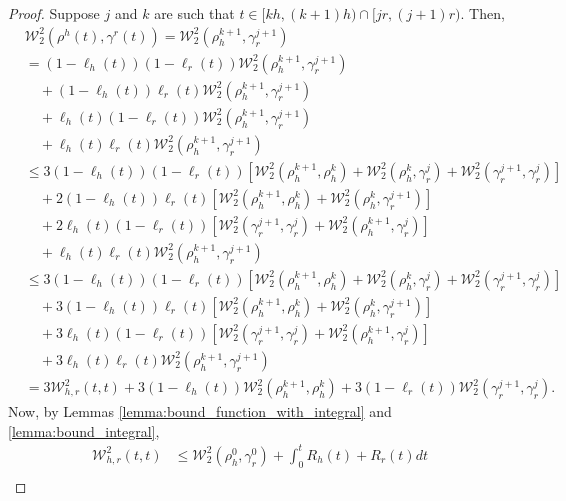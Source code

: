 \documentclass[final,12pt]{colt2018}
\newcommand{\was}{\mathcal{W}}
\begin{document}
\begin{proof}
Suppose $j$ and $k$ are such that $t \in [kh, (k+1)h) \cap  [jr, (j+1)r)$. Then,
\begin{align*}
&\was^2_2 (\rho^{h}(t), \gamma^{r}(t))  = \was_2^2(\rho_{h}^{k+1},\gamma_{r}^{j+1}) \\
&=  (1- \ell_{h}(t))(1- \ell_{r}(t))\was_2^2(\rho_{h}^{k+1},\gamma_{r}^{j+1})  \\
&\quad +(1- \ell_{h}(t))\ell_{r}(t)\was_2^2(\rho_{h}^{k+1},\gamma_{r}^{j+1})   \\
&\quad + \ell_{h}(t) (1- \ell_{r}(t))\was_2^2(\rho_{h}^{k+1},\gamma_{r}^{j+1})  \\
&\quad + \ell_{h}(t)\ell_{r}(t) \was_2^2(\rho_{h}^{k+1},\gamma_{r}^{j+1}) \\
&\leq  3(1- \ell_{h}(t))(1- \ell_{r}(t))\left[ \was_2^2(\rho_{h}^{k+1},\rho_{h}^{k}) + \was_2^2(\rho_{h}^{k},\gamma_{r}^{j}) + \was_2^2(\gamma_{r}^{j+1},\gamma_{r}^{j})\right]  \\
&\quad +2(1- \ell_{h}(t))\ell_{r}(t)\left[ \was_2^2(\rho_{h}^{k+1},\rho_{h}^{k}) + \was_2^2(\rho_{h}^{k},\gamma_{r}^{j+1})\right]  \\
&\quad + 2\ell_{h}(t) (1- \ell_{r}(t))\left[ \was_2^2(\gamma_{r}^{j+1},\gamma_{r}^{j}) + \was_2^2(\rho_{h}^{k+1},\gamma_{r}^{j}) \right]  \\
&\quad + \ell_{h}(t)\ell_{r}(t) \was_2^2(\rho_{h}^{k+1},\gamma_{r}^{j+1}) \\
&\leq  3(1- \ell_{h}(t))(1- \ell_{r}(t))\left[ \was_2^2(\rho_{h}^{k+1},\rho_{h}^{k}) + \was_2^2(\rho_{h}^{k},\gamma_{r}^{j}) + \was_2^2(\gamma_{r}^{j+1},\gamma_{r}^{j})\right]  \\
&\quad +3(1- \ell_{h}(t))\ell_{r}(t)\left[ \was_2^2(\rho_{h}^{k+1},\rho_{h}^{k}) + \was_2^2(\rho_{h}^{k},\gamma_{r}^{j+1})\right]  \\
&\quad + 3\ell_{h}(t) (1- \ell_{r}(t))\left[ \was_2^2(\gamma_{r}^{j+1},\gamma_{r}^{j}) + \was_2^2(\rho_{h}^{k+1},\gamma_{r}^{j}) \right]  \\
&\quad + 3\ell_{h}(t)\ell_{r}(t) \was_2^2(\rho_{h}^{k+1},\gamma_{r}^{j+1}) \\
& =  3\was^2_{h, r}(t,t) + 3(1- \ell_{h}(t))\was_2^2(\rho_{h}^{k+1},\rho_{h}^{k}) + 3(1- \ell_{r}(t)) \was_2^2(\gamma_{r}^{j+1},\gamma_{r}^{j}).
\end{align*}
Now, by Lemmas \ref{lemma:bound_function_with_integral} and \ref{lemma:bound_integral}, 
\begin{align}
\was^2_{h, r}(t,t) &\leq \was_2^2(\rho_{h}^0, \gamma_{r}^0) +  \int_0^t R_{h}(t) +  R_{r}(t) dt\\

\end{align}
\end{proof}
\end{document}
